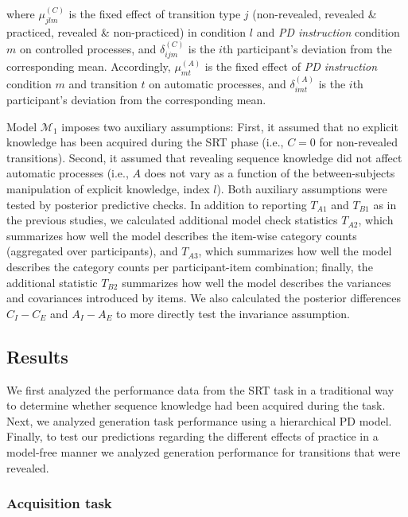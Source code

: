 \documentclass[floatsintext,man]{apa6}
\begin{document}
where \(\mu_{jlm}^{(C)}\) is the fixed effect of transition type \(j\)
(non-revealed, revealed \& practiced, revealed \& non-practiced) in
condition \(l\) and \emph{PD instruction} condition \(m\) on controlled
processes, and \(\delta_{ijm}^{(C)}\) is the \(i\)th participant's
deviation from the corresponding mean. Accordingly, \(\mu_{mt}^{(A)}\)
is the fixed effect of \emph{PD instruction} condition \(m\) and
transition \(t\) on automatic processes, and \(\delta_{imt}^{(A)}\) is
the \(i\)th participant's deviation from the corresponding mean.

Model \(\mathcal{M}_1\) imposes two auxiliary assumptions: First, it
assumed that no explicit knowledge has been acquired during the SRT
phase (i.e., \(C=0\) for non-revealed transitions). Second, it assumed
that revealing sequence knowledge did not affect automatic processes
(i.e., \(A\) does not vary as a function of the between-subjects
manipulation of explicit knowledge, index \(l\)). Both auxiliary
assumptions were tested by posterior predictive checks. In addition to
reporting \(T_{A1}\) and \(T_{B1}\) as in the previous studies, we
calculated additional model check statistics \(T_{A2}\), which
summarizes how well the model describes the item-wise category counts
(aggregated over participants), and \(T_{A3}\), which summarizes how
well the model describes the category counts per participant-item
combination; finally, the additional statistic \(T_{B2}\) summarizes how
well the model describes the variances and covariances introduced by
items. We also calculated the posterior differences \(C_I - C_E\) and
\(A_I - A_E\) to more directly test the invariance assumption.

\subsection{Results}\label{results-2}

We first analyzed the performance data from the SRT task in a
traditional way to determine whether sequence knowledge had been
acquired during the task. Next, we analyzed generation task performance
using a hierarchical PD model. Finally, to test our predictions
regarding the different effects of practice in a model-free manner we
analyzed generation performance for transitions that were revealed.

\subsubsection{Acquisition task}\label{acquisition-task-2}
\end{document}
